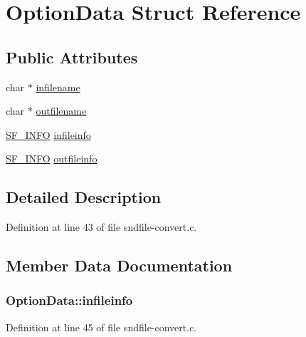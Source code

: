 \hypertarget{struct_option_data}{}\section{Option\+Data Struct Reference}
\label{struct_option_data}
\subsection*{Public Attributes}
\begin{DoxyCompactItemize}
\item 
char $\ast$ \hyperlink{struct_option_data_a248bc231164132ff17fc7da4dcc7808f}{infilename}
\item 
char $\ast$ \hyperlink{struct_option_data_ae97172c3e0c5475ea8c2e5c0be75e0cc}{outfilename}
\item 
\hyperlink{struct_s_f___i_n_f_o}{S\+F\+\_\+\+I\+N\+FO} \hyperlink{struct_option_data_af3c805daff3bc7141f4bcf46bd6ce71a}{infileinfo}
\item 
\hyperlink{struct_s_f___i_n_f_o}{S\+F\+\_\+\+I\+N\+FO} \hyperlink{struct_option_data_a3c3ca50a184e03c480830775473b1a1d}{outfileinfo}
\end{DoxyCompactItemize}


\subsection{Detailed Description}


Definition at line 43 of file sndfile-\/convert.\+c.



\subsection{Member Data Documentation}
\subsubsection[{\texorpdfstring{infileinfo}{infileinfo}}]{ Option\+Data\+::infileinfo}\hypertarget{struct_option_data_af3c805daff3bc7141f4bcf46bd6ce71a}{}\label{struct_option_data_af3c805daff3bc7141f4bcf46bd6ce71a}


Definition at line 45 of file sndfile-\/convert.\+c.

